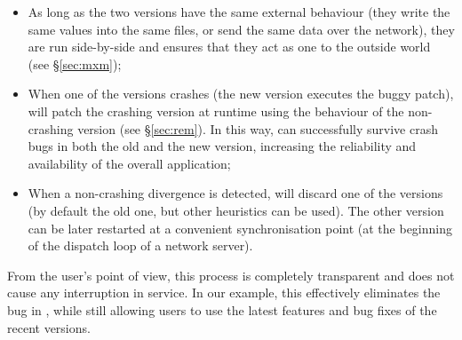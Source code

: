 \begin{itemize}
\item As long as the two versions have the same external behaviour (\eg they 
write the same values into the same files, or send the same data over
the network), they are run side-by-side and \mx ensures that they act
as one to the outside world (see \S\ref{sec:mxm});

\item{When one of the versions crashes (\eg the new version executes 
the buggy patch), \mx will patch the crashing version at runtime using
the behaviour of the non-crashing version 
(see \S\ref{sec:rem})}.  In this way, \mx can successfully survive
crash bugs in both the old and the new version, increasing the
reliability and availability of the overall application;

\item When a non-crashing divergence is detected, \mx will discard one of
the versions (by default the old one, but other heuristics can be
used).  The other version can be later restarted at a convenient
synchronisation point (\eg at the beginning of the dispatch loop of
a network server).

\end{itemize}


From the user's point of view, this process is completely transparent
and does not cause any interruption in service. In our example, this
effectively eliminates the bug in \lighttpd, while still allowing
users to use the latest features and bug fixes of the recent versions.


